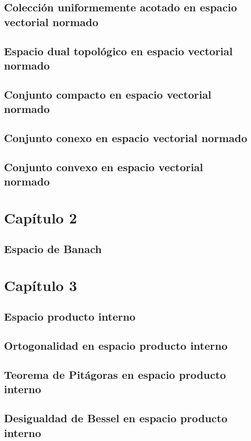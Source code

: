 \documentclass[a4paper]{scrbook}
\theoremstyle{definition}
\begin{document}
\section{Colección uniformemente acotado en espacio vectorial normado}
\section{Espacio dual topológico en espacio vectorial normado}
\section{Conjunto compacto en espacio vectorial normado}
\section{Conjunto conexo en espacio vectorial normado}
\section{Conjunto convexo en espacio vectorial normado}

\chapter{Capítulo 2}
\section{Espacio de Banach}

\chapter{Capítulo 3}
\section{Espacio producto interno}
\section{Ortogonalidad en espacio producto interno}
\section{Teorema de Pitágoras en espacio producto interno}
\section{Desigualdad de Bessel en espacio producto interno}
\end{document}
